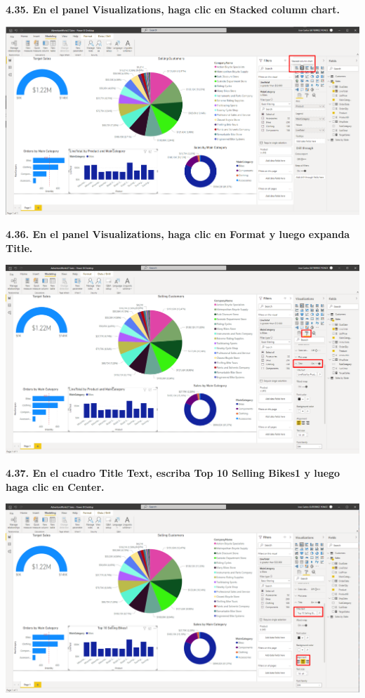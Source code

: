 \documentclass{article}
\begin{document}
\newpage
\textbf{4.35. En el panel \textbf{Visualizations}, haga clic en \textbf{Stacked column chart}.}

    \begin{center}
		\includegraphics[width=14cm]{./images/111} 
	\end{center}


\textbf{4.36. En el panel \textbf{Visualizations}, haga clic en \textbf{Format} y luego expanda \textbf{Title}.}

    \begin{center}
		\includegraphics[width=14cm]{./images/112} 
	\end{center}

\newpage
\textbf{4.37. En el cuadro \textbf{Title Text}, escriba \textbf{Top 10 Selling Bikes1} y luego haga clic en \textbf{Center}.}

    \begin{center}
		\includegraphics[width=14cm]{./images/113} 
	\end{center}
\end{document}
